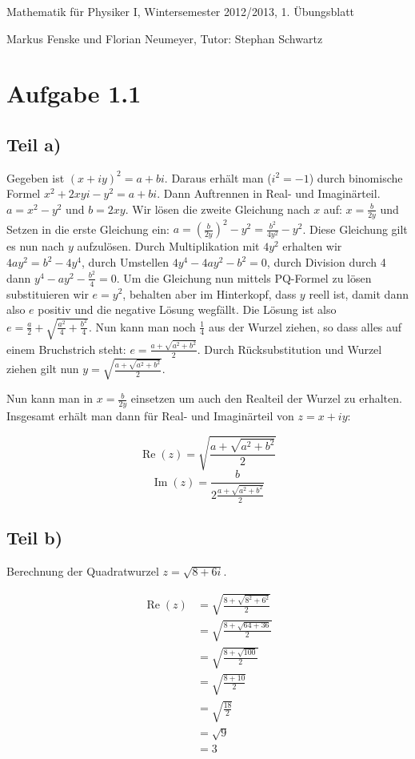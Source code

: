\documentclass[a4paper,german,12pt]{article}
\begin{document}
Mathematik für Physiker I, Wintersemester 2012/2013, 1. Übungsblatt

Markus Fenske und Florian Neumeyer, Tutor: Stephan Schwartz

\section*{Aufgabe 1.1}
\subsection*{Teil a)}

Gegeben ist $(x+iy)^2 = a+bi$. Daraus erhält man ($i^2 = -1$) durch binomische
Formel $x^2+2xyi-y^2 = a+bi$. Dann Auftrennen in Real- und Imaginärteil. $a =
x^2-y^2$ und $b = 2xy$. Wir lösen die zweite Gleichung nach $x$ auf: $x =
\frac{b}{2y}$ und Setzen in die erste Gleichung ein: $a = \left(\frac{b}{2y}\right)^2 -
y^2 = \frac{b^2}{4y^2} - y^2$. Diese Gleichung gilt es nun nach $y$ aufzulösen.
Durch Multiplikation mit $4y^2$ erhalten wir $4ay^2 = b^2 - 4y^4$, durch
Umstellen $4y^4 - 4ay^2 - b^2 = 0$, durch Division durch 4 dann $y^4 - ay^2 -
\frac{b^2}{4} = 0$. Um die Gleichung nun mittels PQ-Formel zu
lösen substituieren wir $e = y^2$, behalten aber im Hinterkopf, dass $y$ reell
ist, damit dann also $e$ positiv und die negative Lösung wegfällt. Die Lösung
ist also $e = \frac{a}{2} + \sqrt{\frac{a^2}{4} + \frac{b^2}{4}}$. Nun kann man
noch $\frac{1}{4}$ aus der Wurzel ziehen, so dass alles auf einem Bruchstrich
steht: $e = \frac{a + \sqrt{a^2 + b^2}}{2}$. Durch Rücksubstitution und Wurzel
ziehen gilt nun $y = \sqrt{\frac{a + \sqrt{a^2 + b^2}}{2}}$.

Nun kann man in $x = \frac{b}{2y}$ einsetzen um auch den Realteil der Wurzel zu
erhalten. Insgesamt erhält man dann für Real- und Imaginärteil von $z = x+iy$:

$$\operatorname{Re}(z) = \sqrt{\frac{a + \sqrt{a^2 + b^2}}{2}}$$
$$\operatorname{Im}(z) = \frac{b}{2\frac{a + \sqrt{a^2 + b^2}}{2}}$$

\subsection{Teil b)}

Berechnung der Quadratwurzel $z = \sqrt{8+6i}$.

\begin{align}
\operatorname{Re}(z) &= \sqrt{\frac{8 + \sqrt{8^2 + 6^2}}{2}} \\
&= \sqrt{\frac{8 + \sqrt{64 + 36}}{2}} \\
&= \sqrt{\frac{8 + \sqrt{100}}{2}} \\
&= \sqrt{\frac{8 + 10}{2}} \\
&= \sqrt{\frac{18}{2}} \\
&= \sqrt{9} \\
&= 3 \\
\end{align}
\end{document}
